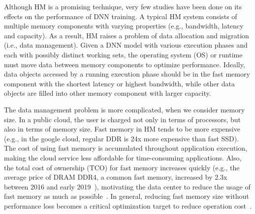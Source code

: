 \textcolor{check}{Although HM is a promising technique, very few studies have been done on its effects on the performance of DNN training. }
A typical HM system consists of multiple memory components with varying properties (e.g., bandwidth, latency and capacity). As a result, HM raises a problem of data allocation and migration (i.e., data management). Given a DNN model with various execution phases and each with possibly distinct working sets, \textcolor{check}{the operating system (OS) or runtime }must move data between memory components to optimize performance. Ideally, data objects accessed by a running execution phase should be in the fast memory component with the shortest latency or highest bandwidth, while other data objects are filled into other memory component with larger capacity. 


The data management problem is more complicated, when we consider memory size. In a public cloud, the user is charged not only in terms of processors, but also in terms of memory size. Fast memory in HM tends to be more expensive (e.g., in the google cloud, regular DDR is 24x more expensive than fast SSD). The cost of using fast memory is accumulated throughout application execution, making the cloud service less affordable for time-consuming applications. Also, the total cost of ownership (TCO) for fast memory increases quickly (e.g., the average price of DRAM DDR4, a common fast memory,  increased by 2.3x between 2016 and early 2019~\cite{ram_price, ram_price2}), motivating the data center to reduce the usage of fast memory as much as possible~\cite{Eisenman:2018:RDF:3190508.3190524}. In general, reducing fast memory size without performance loss becomes a critical optimization target to reduce operation cost~\cite{DBLP:journals/corr/abs-1901-10938, Eisenman:2018:RDF:3190508.3190524}.  

